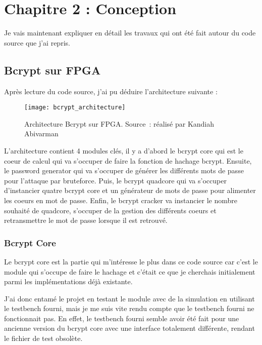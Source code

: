 \chapter{Chapitre 2 : Conception}

Je vais maintenant expliquer en détail les travaux qui ont été fait autour du code source que j'ai repris.

\section{Bcrypt sur FPGA}

Après lecture du code source, j'ai pu déduire l'architecture suivante :

\begin{figure}[tbph!]
	\centering
	\texttt{[image: bcrypt\_architecture]}
	\caption[Architecture Bcrypt sur FPGA]{Architecture Bcrypt sur FPGA. Source : réalisé par Kandiah Abivarman}
	\label{fig:bcrypt_architecture}
\end{figure}

L'architecture contient 4 modules clés, il y a d'abord le bcrypt core qui est le coeur de calcul qui va s'occuper de faire la fonction de hachage bcrypt. Ensuite, le password generator qui va s'occuper de générer les différents mots de passe pour l'attaque par bruteforce. Puis, le bcrypt quadcore qui va s'occuper d'instancier quatre bcrypt core et un générateur de mots de passe pour alimenter les coeurs en mot de passe. Enfin, le bcrypt cracker va instancier le nombre souhaité de quadcore, s'occuper de la gestion des différents coeurs et retransmettre le mot de passe lorsque il est retrouvé.

\subsection{Bcrypt Core}

Le bcrypt core est la partie qui m'intéresse le plus dans ce code source car c'est le module qui s'occupe de faire le hachage et c'était ce que je cherchais initialement parmi les implémentations déjà existante.

J'ai donc entamé le projet en testant le module avec de la simulation en utilisant le testbench fourni, mais je me suis vite rendu compte que le testbench fourni ne fonctionnait pas. En effet, le testbench fourni semble avoir été fait pour une ancienne version du bcrypt core avec une interface totalement différente, rendant le fichier de test obsolète.

